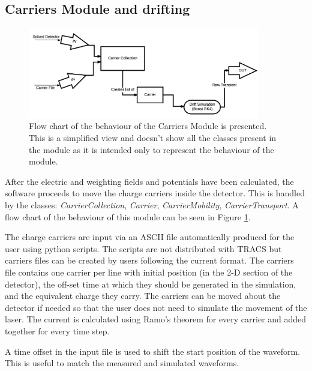 \subsection{Carriers Module and drifting}

\begin{figure}[H]
	\centering
	\includegraphics[width=0.9\textwidth]{Carriers_Module.png}
	\caption{Flow chart of the behaviour of the Carriers Module is presented. This is a simplified view and doesn't show all the classes present in the module as it is intended only to represent the behaviour of the module.}
	\label{fig:CarrierFc}
\end{figure}

After the electric and weighting fields and potentials have been calculated, the software proceeds to move the charge carriers inside the detector. This is handled by the classes: \textit{CarrierCollection}, \textit{Carrier}, \textit{CarrierMobility}, \textit{CarrierTransport}. A flow chart of the behaviour of this module can be seen in Figure \ref{fig:CarrierFc}.

The charge carriers are input via an ASCII file automatically produced for the user using python scripts. The scripts are not distributed with TRACS but carriers files can be created by users following the current format. The carriers file contains one carrier per line with initial position (in the 2-D section of the detector), the off-set time at which they should be generated in the simulation, and the equivalent charge they carry. The carriers can be moved about the detector if needed so that the user does not need to simulate the movement of the laser. The current is calculated using Ramo's theorem for every carrier and added together for every time step.

A time offset in the input file is used to shift the start position of the waveform. This is useful to match the measured and simulated waveforms.


